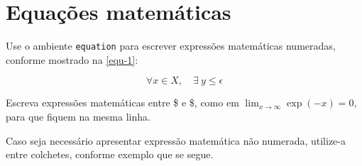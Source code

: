 \begin{table}[htb]

\centering
\caption{Previsão de resultado para os primeiros colocados do Brasileirão 2023 (outra forma)} %
\label{tab-my-table} %

%
\end{table}



\section{Equações matemáticas}

Use o ambiente \texttt{equation} para escrever
expressões matemáticas numeradas, conforme mostrado na \autoref{equ-1}:

\begin{equation}\label{equ-1}
  \forall x \in X, \quad \exists \: y \leq \epsilon
\end{equation}

Escreva expressões matemáticas entre \$ e \$, como em $ \lim_{x \to \infty}
\exp(-x) = 0 $, para que fiquem na mesma linha.

Caso seja necessário apresentar expressão matemática não numerada, utilize-a entre colchetes, conforme exemplo que se segue.

